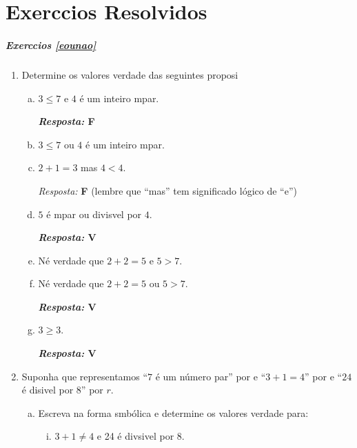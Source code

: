 \chapter*{Exerc\ih cios Resolvidos}

\paragraph{Exerc\ih cios \ref{eounao}}
\begin{enumerate}[{\bf 1.}]
\item Determine os valores verdade das seguintes proposi\coes 
\begin{enumerate}[a)]
\item $3\leq7$ e $4$ \'e um inteiro \ih mpar. 

{\bf{\it Resposta:} F}

\item $3\leq7$ ou $4$ \'e um inteiro \ih mpar. 

\item $2+1=3$ mas $4<4$. 

{\it Resposta:} {\bf F} (lembre que ``mas'' tem significado l\'ogico de ``e'')

\item $5$ \'e \ih mpar ou divis\ih vel por $4$. 

{\bf{\it Resposta:} V}

\item N\ao \'e verdade que $2+2=5$ e $5>7$.

\item N\ao \'e verdade que $2+2=5$ ou $5>7$. 

{\bf{\it Resposta:} V}

\item $3 \geq 3$. 

{\bf{\it Resposta:} V}
\end{enumerate}

\item Suponha que representamos ``$7$ \'e um n\'umero par'' por \pp e ``$3+1=4$'' por \qq e ``$24$ \'e di\ih sivel por $8$'' por $r$. 
\begin{enumerate}[a)]
\item Escreva na forma s\ih mb\'olica e determine os valores verdade para:
\begin{enumerate}[i)]
\item $3+1 \neq 4$ e 24 \'e div\ih sivel por 8. 


\end{enumerate}
\end{enumerate}
\end{enumerate}
